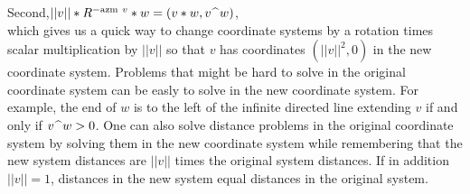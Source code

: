 \documentclass[12pt]{article}
\begin{document}
Second,\hspace{0.5in}$||v||*R^{-\mathrm{azm}~v}*w=(v*w,v\,\widehat{~}\, w)$,
\\[1ex]
which gives us a quick way to change coordinate systems
by a rotation times scalar multiplication by $||v||$ so that
$v$ has coordinates $(||v||^2,0)$ in the new coordinate system.
Problems that might be hard to solve in the original
coordinate system can be easly to solve in the new coordinate
system.  For example, the end of $w$ is to the left of the infinite directed
line extending $v$ if and only if $v\,\widehat{~}\, w>0$.  One can also solve
distance problems in the original coordinate system by solving them
in the new coordinate system while remembering that the new system distances
are $||v||$ times the original system distances.  If in addition
$||v||=1$, distances in the new system equal distances in the original
system.

\bigskip
\end{document}
